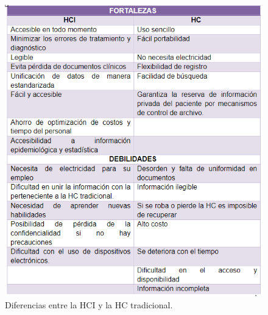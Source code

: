 \begin{center}
	\begin{figure}
		\caption{Diferencias entre la HCI y la HC tradicional. }
		\label{HCIvsHC}
		\includegraphics[]{MainMatter/HCIvsHC.PNG}
	\end{figure}
\end{center}

